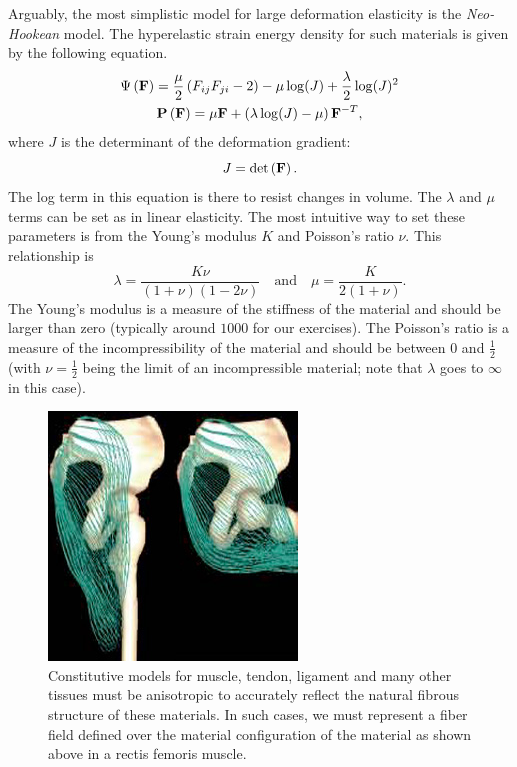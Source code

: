 Arguably, the most simplistic model for large deformation elasticity is the \emph{Neo-Hookean} model. The hyperelastic strain energy density for such materials is given by the following equation.
\begin{gather*}
\Psi \left( \mathbf{F} \right) = \frac{\mu}{2} \left( F_{ij} F_{ji} - 2 \right) - \mu \log(J) + \frac{\lambda}{2} \log(J)^2 \\
\mathbf{P} \left( \mathbf{F} \right) = \mu \mathbf{F} + \left( \lambda \log(J) - \mu \right) \mathbf{F}^{-T},
\end{gather*}
where  $J$ is the determinant of the deformation gradient:
\begin{equation*}
J = \det \left( \mathbf{F} \right).
\end{equation*}
The log term in this equation is there to resist changes in volume. The $\lambda$ and $\mu$ terms can be set as in linear elasticity. The most intuitive way to set these parameters is from the Young's modulus $K$ and Poisson's ratio $\nu$. This relationship is
\begin{equation*}
\lambda = \frac{K \nu}{(1 + \nu)(1 - 2\nu)} \quad \text{and} \quad \mu = \frac{K}{2 (1 + \nu)}.
\end{equation*}
The Young's modulus is a measure of the stiffness of the material and should be larger than zero (typically around $1000$ for our exercises). The Poisson's ratio is a measure of the incompressibility of the material and should be between 0 and $\frac{1}{2}$ (with $\nu = \frac{1}{2}$ being the limit of an incompressible material; note that $\lambda$ goes to $\infty$ in this case).

\begin{figure}
\includegraphics[width=.5\columnwidth]{images/muscle_biomechanics_2005}
\caption{Constitutive models for muscle, tendon, ligament and many other tissues must be anisotropic to accurately reflect the natural fibrous structure of these materials. In such cases, we must represent a fiber field defined over the material configuration of the material as shown above in a rectis femoris muscle.}
\label{fig:fibers}
\end{figure}

